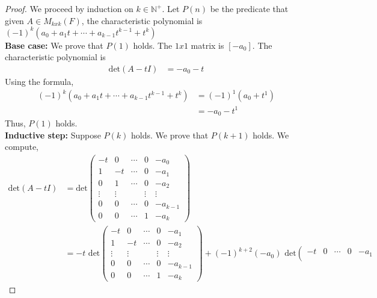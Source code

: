 \documentclass[11pt]{scrartcl}
\begin{document}
\begin{proof}
	We proceed by induction on $k \in \mathbb{N}^+$.
	Let $P(n)$ be the predicate that given $A \in M_{kxk}(F)$, the characteristic polynomial
	is $(-1)^{k}\left(a_{0}+a_{1} t+\cdots+a_{k-1} t^{k-1}+t^{k}\right)$\\
	\textbf{Base case:} We prove that $P(1)$ holds. The $1x1$ matrix is $[-a_0]$. The characteristic polynomial
	is
	\begin{align*}
		\text{det}(A - tI) & =  -a_0 - t
	\end{align*}
	Using the formula,
	\begin{align*}
		(-1)^{k}(a_{0}+a_{1} t+\cdots+a_{k-1} t^{k-1}+t^{k}) & = (-1)^{1}(a_{0} + t^{1}) \\
		                                                     & =  -a_{0} - t^{1}
	\end{align*}
	Thus, $P(1)$ holds.\\
	\textbf{Inductive step:} Suppose $P(k)$ holds. We prove that $P(k + 1)$ holds.
	We compute,
	\begin{align*}
		\text{det}(A - tI) & = \text{det}
		\left(\begin{array}{ccccc}
				-t     & 0      & \cdots & 0      & -a_{0}   \\
				1      & -t     & \cdots & 0      & -a_{1}   \\
				0      & 1      & \cdots & 0      & -a_{2}   \\
				\vdots & \vdots &        & \vdots & \vdots   \\
				0      & 0      & \cdots & 0      & -a_{k-1} \\
				0      & 0      & \cdots & 1      & -a_{k}
			\end{array}\right)                                                                \\
		                   & = -t \text{ det}
		\left(\begin{array}{ccccc}
				-t     & 0      & \cdots & 0      & -a_{1}   \\
				1      & -t     & \cdots & 0      & -a_{2}   \\
				\vdots & \vdots &        & \vdots & \vdots   \\
				0      & 0      & \cdots & 0      & -a_{k-1} \\
				0      & 0      & \cdots & 1      & -a_{k}
			\end{array}\right) + (-1)^{k + 2} (-a_0) \text{ det}
		\left(\begin{array}{ccccc}
				-t     & 0      & \cdots & 0      & -a_{1}   \\

\end{array}
\end{align*}
\end{proof}
\end{document}
